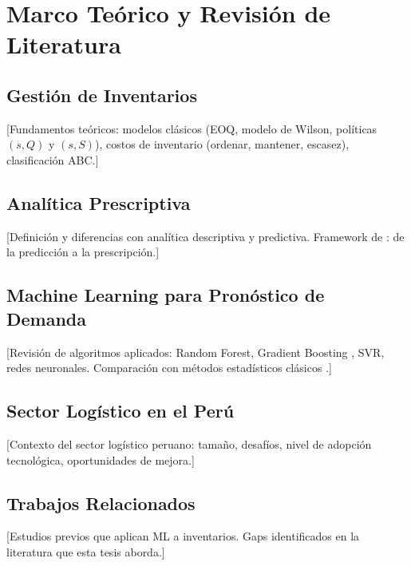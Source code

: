 \section{Marco Te\'{o}rico y Revisi\'{o}n de Literatura}
\label{sec:literature}

\subsection{Gesti\'{o}n de Inventarios}
\label{subsec:inventory}

[Fundamentos te\'{o}ricos: modelos cl\'{a}sicos (EOQ, modelo de Wilson, pol\'{i}ticas $(s, Q)$ y $(s, S)$), costos de inventario (ordenar, mantener, escasez), clasificaci\'{o}n ABC.]

\subsection{Anal\'{i}tica Prescriptiva}
\label{subsec:prescriptive}

[Definici\'{o}n y diferencias con anal\'{i}tica descriptiva y predictiva. Framework de \cite{bertsimas2020predictive}: de la predicci\'{o}n a la prescripci\'{o}n.]

\subsection{Machine Learning para Pron\'{o}stico de Demanda}
\label{subsec:ml-forecasting}

[Revisi\'{o}n de algoritmos aplicados: Random Forest, Gradient Boosting \parencite{chen2016xgboost, ke2017lightgbm}, SVR, redes neuronales. Comparaci\'{o}n con m\'{e}todos estad\'{i}sticos cl\'{a}sicos \parencite{carbonneau2008application}.]

\subsection{Sector Log\'{i}stico en el Per\'{u}}
\label{subsec:peru-logistics}

[Contexto del sector log\'{i}stico peruano: tama\~{n}o, desaf\'{i}os, nivel de adopci\'{o}n tecnol\'{o}gica, oportunidades de mejora.]

\subsection{Trabajos Relacionados}
\label{subsec:related-work}

[Estudios previos que aplican ML a inventarios. Gaps identificados en la literatura que esta tesis aborda.]

